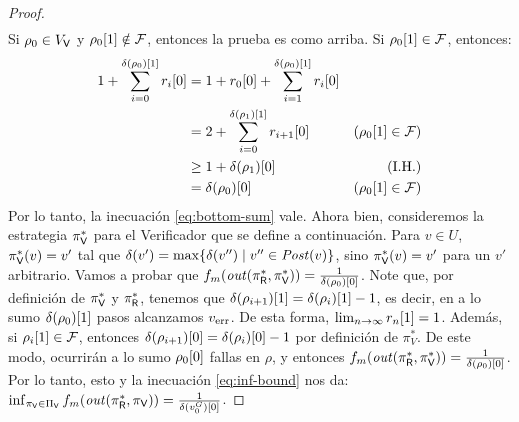 \begin{proof}
\begin{align*}
\end{align*}
 Si $\rho_0 \in V_\Verifier$ y $\pr{1}{\rho_0} \notin \Faults$, entonces la prueba es como arriba. Si $\pr{1}{\rho_0} \in \Faults$, entonces:
\begin{align*}
 	1+\sum^{\pr{1}{\delta(\rho_0)}}_{i=0} \pr{0}{r_i} & =  1+\pr{0}{r_0} + \sum^{\pr{1}{\delta(\rho_0)}}_{i=1} \pr{0}{r_i} & \\
					     & =  2 +  \sum^{\pr{1}{\delta(\rho_1)}}_{i=0} \pr{0}{r_{i+1}} &   \text{($\pr{1}{\rho_0} \in \Faults$)}\\
					     & \geq 1 + \pr{0}{\delta(\rho_1)} & \text{(I.H.)} \\
					     & = \pr{0}{\delta(\rho_0)} & \text{($\pr{1}{\rho_0} \in \Faults$)}
\end{align*}
Por lo tanto, la inecuación \ref{eq:bottom-sum} vale. Ahora bien, consideremos la estrategia $\pi^*_\Verifier$ para el Verificador que se define a continuación. Para $v \in U$, $\pi^*_\Verifier(v) = v'$ tal que $\delta(v') = \max \{\delta(v'') \mid v'' \in \post(v)\}$, sino $\pi^*_\Verifier(v) = v'$ para un $v'$ arbitrario. 
Vamos a probar que $\FMask(\out(\pi^*_\Refuter, \pi^*_\Verifier)) = \frac{1}{\pr{0}{\delta(\rho_0)}}$. 
Note que, por definición de $\pi^*_\Verifier$ y $\pi^*_\Refuter$, tenemos que $\pr{1}{\delta(\rho_{i+1})} = \pr{1}{\delta(\rho_i)} - 1$, %
es decir, en a lo sumo $\pr{1}{\delta(\rho_0)}$ pasos alcanzamos $\ErrorSt$. De esta forma, $\lim_{n \rightarrow \infty}  \pr{1}{r_n} =1$. 
Además, si $\pr{1}{\rho_i} \in \Faults$, entonces $\pr{0}{\delta(\rho_{i+1})} = \pr{0}{\delta(\rho_i)} - 1$
por definición de $\pi^*_V$. De este modo, ocurrirán a lo sumo $\pr{0}{\rho_0}$ fallas en $\rho$, y entonces
$\FMask(\out(\pi^*_\Refuter, \pi^*_\Verifier)) = \frac{1}{\pr{0}{\delta(\rho_0)}}$. Por lo tanto, esto y la inecuación \ref{eq:inf-bound} nos da: 
$\inf_{\pi_\Verifier \in \Pi_\Verifier} \FMask(\out(\pi^*_\Refuter, \pi_\Verifier)) = \frac{1}{\pr{0}{\delta(v^G_0)}}$. 



\end{proof}
